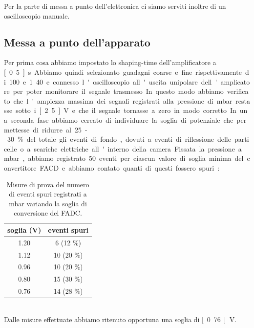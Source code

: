 \documentclass[italian,a4paper]{article}
\begin{document}
Per la parte di messa a punto dell'elettronica ci siamo serviti inoltre di un oscilloscopio manuale.
\subsection*{Messa a punto dell'apparato}
Per prima cosa abbiamo impostato lo shaping-time dell'amplificatore a \unit[0.5]{\micro s}. Abbiamo quindi selezionato guadagni coarse e fine rispettivamente di 100 e 1.40 e connesso l'oscilloscopio all'uscita unipolare dell'amplicatore per poter monitorare il segnale trasmesso. In questo modo abbiamo verificato che l'ampiezza massima dei segnali registrati alla pressione di \unit[600]{mbar} restasse sotto i \unit[2.5]{V} e che il segnale tornasse a zero in modo corretto.

In una seconda fase abbiamo cercato di individuare la soglia di potenziale che permettesse di ridurre al 25-30~\% del totale gli eventi di fondo, dovuti a eventi di riflessione delle particelle o a scariche elettriche all'interno della camera. Fissata la pressione a \unit[600]{mbar}, abbiamo registrato 50 eventi per ciascun valore di soglia minima del convertitore FACD e abbiamo contato quanti di questi fossero spuri:
\begin{table}[h!]\centering
\begin{tabular}{*2c}
soglia (V)&  eventi spuri\\\hline
1.20&		6 (12 \%)\\
1.12&		10 (20 \%)\\
0.96&		10 (20 \%)\\
0.80&		15 (30 \%)\\
0.76&		14 (28 \%)
\end{tabular}
\caption{Misure di prova del numero di eventi spuri registrati a \unit[600]{mbar} variando la soglia di conversione del FADC.}
\end{table}\\
Dalle misure effettuate abbiamo ritenuto opportuna una soglia di \unit[0.76]{V}.
\end{document}
